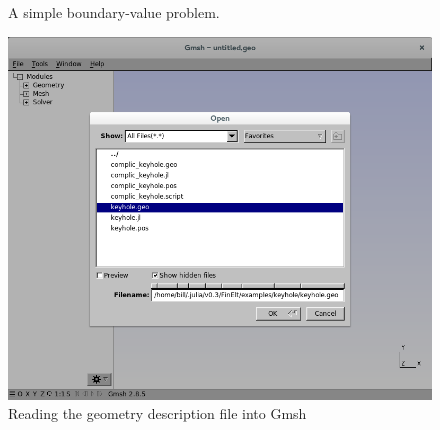 \documentclass[a4paper,12pt]{article}
\begin{document}
\begin{figure}
\caption{A simple boundary-value problem.}
\label{fig: simple bvp}
\begin{center}
\end{center}
\end{figure}
\begin{figure}
\caption{Reading the geometry description file into Gmsh}
\label{fig: open file}
\begin{center}
\includegraphics[scale=0.4]{images/open_geo_file.png}
\end{center}
\end{figure}
\end{document}
